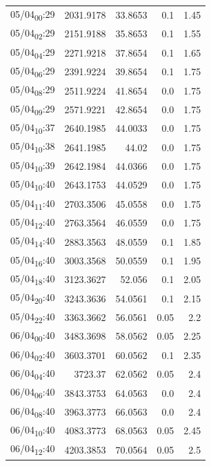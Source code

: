 \documentclass[11pt]{article}
\begin{document}
\begin{center}
\begin{tabular}{lrrrr}
05/04\textsubscript{00}:29 & 2031.9178 & 33.8653 & 0.1 & 1.45\\[0pt]
05/04\textsubscript{02}:29 & 2151.9188 & 35.8653 & 0.1 & 1.55\\[0pt]
05/04\textsubscript{04}:29 & 2271.9218 & 37.8654 & 0.1 & 1.65\\[0pt]
05/04\textsubscript{06}:29 & 2391.9224 & 39.8654 & 0.1 & 1.75\\[0pt]
05/04\textsubscript{08}:29 & 2511.9224 & 41.8654 & 0.0 & 1.75\\[0pt]
05/04\textsubscript{09}:29 & 2571.9221 & 42.8654 & 0.0 & 1.75\\[0pt]
05/04\textsubscript{10}:37 & 2640.1985 & 44.0033 & 0.0 & 1.75\\[0pt]
05/04\textsubscript{10}:38 & 2641.1985 & 44.02 & 0.0 & 1.75\\[0pt]
05/04\textsubscript{10}:39 & 2642.1984 & 44.0366 & 0.0 & 1.75\\[0pt]
05/04\textsubscript{10}:40 & 2643.1753 & 44.0529 & 0.0 & 1.75\\[0pt]
05/04\textsubscript{11}:40 & 2703.3506 & 45.0558 & 0.0 & 1.75\\[0pt]
05/04\textsubscript{12}:40 & 2763.3564 & 46.0559 & 0.0 & 1.75\\[0pt]
05/04\textsubscript{14}:40 & 2883.3563 & 48.0559 & 0.1 & 1.85\\[0pt]
05/04\textsubscript{16}:40 & 3003.3568 & 50.0559 & 0.1 & 1.95\\[0pt]
05/04\textsubscript{18}:40 & 3123.3627 & 52.056 & 0.1 & 2.05\\[0pt]
05/04\textsubscript{20}:40 & 3243.3636 & 54.0561 & 0.1 & 2.15\\[0pt]
05/04\textsubscript{22}:40 & 3363.3662 & 56.0561 & 0.05 & 2.2\\[0pt]
06/04\textsubscript{00}:40 & 3483.3698 & 58.0562 & 0.05 & 2.25\\[0pt]
06/04\textsubscript{02}:40 & 3603.3701 & 60.0562 & 0.1 & 2.35\\[0pt]
06/04\textsubscript{04}:40 & 3723.37 & 62.0562 & 0.05 & 2.4\\[0pt]
06/04\textsubscript{06}:40 & 3843.3753 & 64.0563 & 0.0 & 2.4\\[0pt]
06/04\textsubscript{08}:40 & 3963.3773 & 66.0563 & 0.0 & 2.4\\[0pt]
06/04\textsubscript{10}:40 & 4083.3773 & 68.0563 & 0.05 & 2.45\\[0pt]
06/04\textsubscript{12}:40 & 4203.3853 & 70.0564 & 0.05 & 2.5\\[0pt]

\end{tabular}
\end{center}
\end{document}
